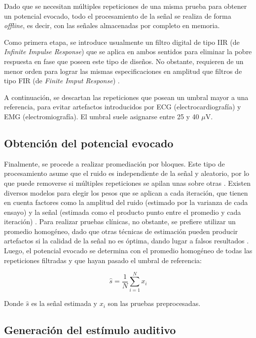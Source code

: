 Dado que se necesitan múltiples repeticiones de una misma prueba para obtener un potencial evocado, todo el procesamiento de la señal se realiza de forma \textit{offline}, es decir, con las señales almacenadas por completo en memoria.

Como primera etapa, se introduce usualmente un filtro digital de tipo IIR (de \textit{Infinite Impulse Response}) que se aplica en ambos sentidos para eliminar la pobre respuesta en fase que poseen este tipo de diseños. No obstante, requieren de un menor orden para lograr las mismas especificaciones en amplitud que filtros de tipo FIR (de \textit{Finite Imput Response}) \cite{madsen-2017-AverageEP}.

A continuación, se descartan las repeticiones que posean un umbral mayor a una referencia, para evitar artefactos introducidos por ECG (electrocardiografía) y EMG (electromiografía). El umbral suele asignarse entre 25 y 40 $\mu$V.

\subsection{Obtención del potencial evocado}

Finalmente, se procede a realizar promediación por bloques. Este tipo de procesamiento asume que el ruido es independiente de la señal y aleatorio, por lo que puede removerse si múltiples repeticiones se apilan unas sobre otras \cite{davila-1992-Weigthed-Average}. Existen diversos modelos para elegir los pesos que se aplican a cada iteración, que tienen en cuenta factores como la amplitud del ruido (estimado por la varianza de cada ensayo) y la señal (estimada como el producto punto entre el promedio y cada iteración) \cite{pander-2014-Weigthed-Average}. Para realizar pruebas clínicas, no obstante, se prefiere utilizar un promedio homogéneo, dado que otras técnicas de estimación pueden producir artefactos si la calidad de la señal no es óptima, dando lugar a falsos resultados \cite{norrix-2019-Weigthed-Average}. Luego, el potencial evocado se determina con el promedio homogéneo de todas las repeticiones filtradas y que hayan pasado el umbral de referencia:

\begin{equation}
\hat{s} = \frac{1}{N} \sum_{i=1}^Nx_i
\label{eq:signal_homogeneous_averaging}
\end{equation}

Donde $\hat{s}$ es la señal estimada y $x_i$ son las pruebas preprocesadas.

\subsection{Generación del estímulo auditivo}

